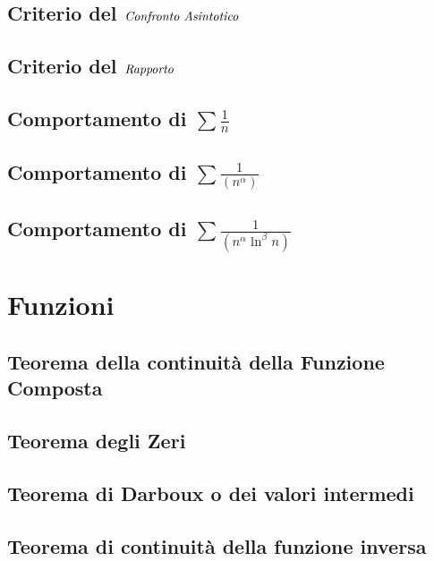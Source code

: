 \documentclass[11pt, a4paper]{article}
\begin{document}
\subsection{Criterio del $\emph{Confronto Asintotico}$}
\subsection{Criterio del $\emph{Rapporto}$}
\subsection{Comportamento di $\sum\frac{1}{n}$}
\subsection{Comportamento di $\sum\frac{1}{(n^\alpha)}$}
\subsection{Comportamento di $\sum\frac{1}{(n^\alpha\ln^\beta n)}$}

\newpage

\section{Funzioni}
\subsection{Teorema della continuità della Funzione Composta}
\subsection{Teorema degli Zeri}
\subsection{Teorema di Darboux o dei valori intermedi}
\subsection{Teorema di continuità della funzione inversa}
\end{document}
